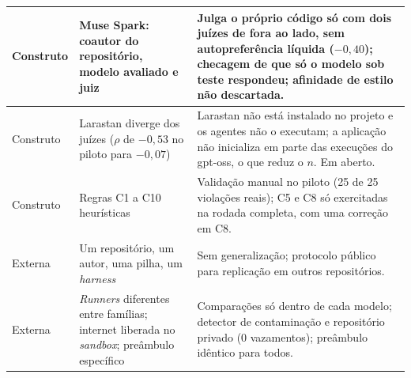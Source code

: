\begin{quadro}[htb]
\begin{tabular}{|l|p{4.6cm}|p{7.6cm}|}
        \hline
        Construto & Muse Spark: coautor do repositório, modelo avaliado e juiz & Julga o próprio código só com dois juízes de fora ao lado, sem autopreferência líquida ($-0{,}40$); checagem de que só o modelo sob teste respondeu; afinidade de estilo não descartada. \\
        \hline
        Construto & Larastan diverge dos juízes ($\rho$ de $-0{,}53$ no piloto para $-0{,}07$) & Larastan não está instalado no projeto e os agentes não o executam; a aplicação não inicializa em parte das execuções do gpt-oss, o que reduz o $n$. Em aberto. \\
        \hline
        Construto & Regras C1 a C10 heurísticas & Validação manual no piloto (25 de 25 violações reais); C5 e C8 só exercitadas na rodada completa, com uma correção em C8. \\
        \hline
        Externa & Um repositório, um autor, uma pilha, um \textit{harness} & Sem generalização; protocolo público para replicação em outros repositórios. \\
        \hline
        Externa & \textit{Runners} diferentes entre famílias; internet liberada no \textit{sandbox}; preâmbulo específico & Comparações só dentro de cada modelo; detector de contaminação e repositório privado (0 vazamentos); preâmbulo idêntico para todos. \\
        \hline
    \end{tabular}
    \fonteautor
\end{quadro}
